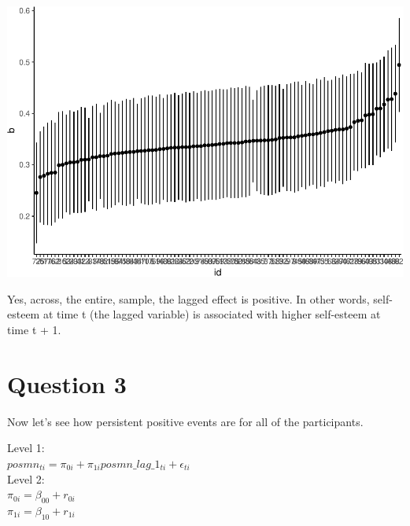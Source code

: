 \documentclass[]{article}
\newenvironment{Shaded}{\begin{snugshade}}{\end{snugshade}}
\newcommand{\KeywordTok}[1]{\textcolor[rgb]{0.13,0.29,0.53}{\textbf{#1}}}
\newcommand{\DataTypeTok}[1]{\textcolor[rgb]{0.13,0.29,0.53}{#1}}
\newcommand{\FloatTok}[1]{\textcolor[rgb]{0.00,0.00,0.81}{#1}}
\newcommand{\StringTok}[1]{\textcolor[rgb]{0.31,0.60,0.02}{#1}}
\newcommand{\OperatorTok}[1]{\textcolor[rgb]{0.81,0.36,0.00}{\textbf{#1}}}
\newcommand{\NormalTok}[1]{#1}
\begin{document}
\includegraphics{Beck_HW_7_R_1_files/figure-latex/unnamed-chunk-4-1.pdf}

\begin{Shaded}
\end{Shaded}

Yes, across, the entire, sample, the lagged effect is positive. In other
words, self-esteem at time t (the lagged variable) is associated with
higher self-esteem at time t + 1.

\section{Question 3}\label{question-3}

Now let's see how persistent positive events are for all of the
participants.

Level 1:\\
\(posmn_{ti} = \pi_{0i} + \pi_{1i}posmn\_lag\_1_{ti} + \epsilon_{ti}\)\\
Level 2:\\
\(\pi_{0i} = \beta_{00} + r_{0i}\)\\
\(\pi_{1i} = \beta_{10} + r_{1i}\)
\end{document}

